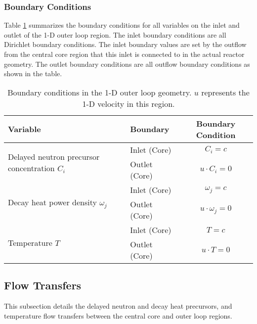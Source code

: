 \subsubsection{Boundary Conditions}

Table \ref{table:loopbc} summarizes the boundary conditions for all variables
on the inlet and outlet of the 1-D outer loop region. The inlet boundary
conditions are all Dirichlet boundary conditions. The inlet boundary values
are set by the outflow from the central core region that this inlet is
connected to in the actual reactor geometry. The outlet boundary conditions
are all outflow boundary conditions as shown in the table.

\begin{table}[htbp!]
    \small
	\caption{Boundary conditions in the 1-D outer loop geometry. $u$
	represents the 1-D velocity in this region.}
	\centering
	\begin{tabular}{ l l c}
		\toprule
		Variable & Boundary & Boundary Condition \\
        \midrule
        \multirow{2}{*}{Delayed neutron precursor concentration $C_i$} &
        Inlet (Core) & $C_i = c$ \\
        & Outlet (Core) & $u \cdot C_i = 0$ \\
        \midrule
        \multirow{2}{*}{Decay heat power density $\omega_j$} &
        Inlet (Core) & $\omega_j = c$ \\
        & Outlet (Core) & $u \cdot \omega_j = 0$ \\
        \midrule
        \multirow{2}{*}{Temperature $T$} &
        Inlet (Core) & $T = c$ \\
        & Outlet (Core) & $u \cdot T = 0$ \\
		\bottomrule
	\end{tabular}
	\label{table:loopbc}
\end{table}

\subsection{Flow Transfers}

This subsection details the delayed neutron and decay heat precursors, and
temperature flow transfers between the central core and outer loop regions. 


